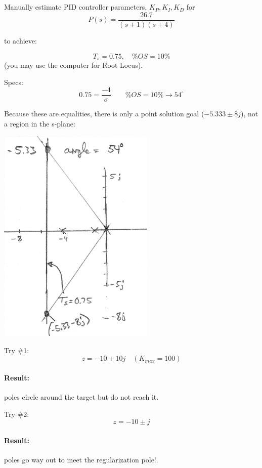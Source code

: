 \documentclass{article}	%
\begin{document}
\subsection{}\label{manualdesign2}

Manually estimate PID controller parameters, $K_P, K_I, K_D$ for
\[
P(s) = \frac  {26.7}{(s+1)(s+4)}
\]

to achieve:

\[
T_s = 0.75, \quad \%OS = 10\%
\]
(you may use the computer for Root Locus).

\begin{solution}
Specs:
\[
0.75 = \frac{-4}{\sigma} \qquad \%OS=10\% \to 54^\circ
\]

Because these are equalities, there is only a point solution goal ($-5.333\pm8j$), not a region in the s-plane:

\includegraphics[width=75mm]{00958a.png}

Try \#1:
\[
z = -10\pm10j \quad (K_{max} = 100)
\]
\paragraph{Result:}  poles circle around the target but do not reach it.


Try \#2:
\[
z = -10\pm j
\]

\paragraph{Result:}  poles go way out to meet the regularization pole!.


\end{solution}
\end{document}
